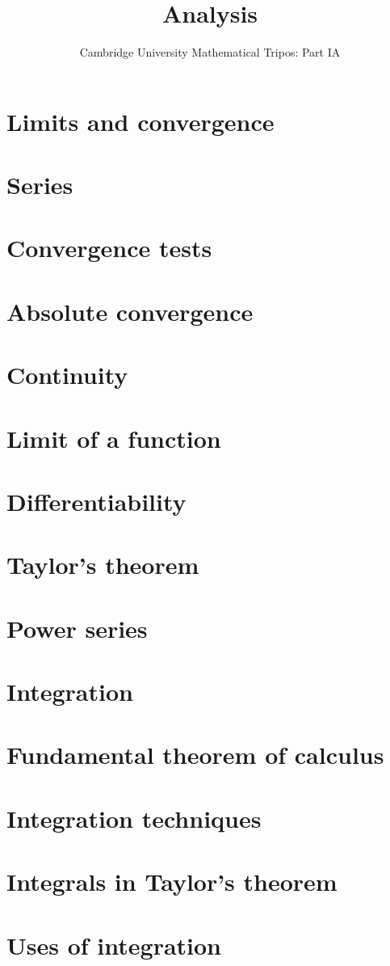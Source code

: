 \documentclass{article}
\title{Analysis}
\author{Cambridge University Mathematical Tripos: Part IA}
\begin{document}
\maketitle

\tableofcontentsnewpage{}

\section{Limits and convergence}

\section{Series}

\section{Convergence tests}

\section{Absolute convergence}

\section{Continuity}

\section{Limit of a function}

\section{Differentiability}

\section{Taylor's theorem}

\section{Power series}

\section{Integration}

\section{Fundamental theorem of calculus}

\section{Integration techniques}

\section{Integrals in Taylor's theorem}

\section{Uses of integration}

\end{document}

